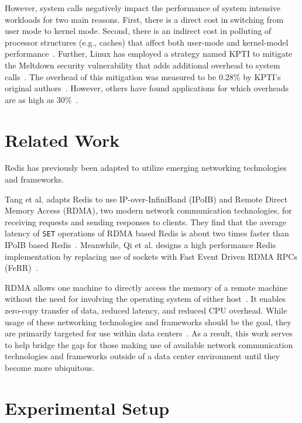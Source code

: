\documentclass[sigconf]{acmart}
\newcommand{\inlinecode}[1]{\texttt{#1}}
\begin{document}
However, system calls negatively impact the performance of system intensive workloads for two main reasons.
First, there is a direct cost in switching from user mode to kernel mode.
Second, there is an indirect cost in polluting of processor structures (e.g., caches) that affect both user-mode and kernel-model performance~\cite{FlexSC}.
Further, Linux has employed a strategy named KPTI to mitigate the Meltdown security vulnerability that adds additional overhead to system calls~\cite{linux-kpti}.
The overhead of this mitigation was measured to be 0.28\% by KPTI's original authors~\cite{kaslr}.
However, others have found applications for which overheads are as high as 30\%~\cite{linux-kpti}.


\section{Related Work}
Redis has previously been adapted to utilize emerging networking technologies and frameworks.

Tang et al. adapts Redis to use IP-over-InfiniBand (IPoIB) and Remote Direct Memory Access (RDMA), two modern network communication technologies, for receiving requests and sending responses to clients. They find that the average latency of \inlinecode{SET} operations of RDMA based Redis is about two times faster than IPoIB based Redis~\cite{RDMAOverTCP}. Meanwhile, Qi et al. designs a high performance Redis implementation by replacing use of sockets with Fast Event Driven RDMA RPCs (FeRR)~\cite{RediswithRPCs5}.

RDMA allows one machine to directly access the memory of a remote machine without the need for involving the operating system of either host~\cite{rdma-def}.
It enables zero-copy transfer of data, reduced latency, and reduced CPU overhead.
While usage of these networking technologies and frameworks should be the goal, they are primarily targeted for use within data centers~\cite{infiniband-datacenter}.
As a result, this work serves to help bridge the gap for those making use of available network communication technologies and frameworks outside of a data center environment until they become more ubiquitous.


\section{Experimental Setup}
\end{document}
